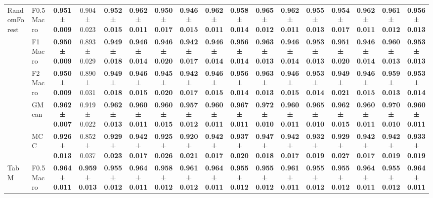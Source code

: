 \begin{table}[H]
{\begin{tabular}{llccccccccccccccc}
\cline{1-17}
\multirow[t]{5}{*}{RandomForest} & F0.5 Macro & \textbf{0.951 ± 0.009} & 0.904 ± 0.023 & \textbf{0.952 ± 0.015} & \textbf{0.962 ± 0.011} & \textbf{0.950 ± 0.017} & \textbf{0.946 ± 0.015} & \textbf{0.962 ± 0.011} & \textbf{0.958 ± 0.014} & \textbf{0.965 ± 0.012} & \textbf{0.962 ± 0.011} & \textbf{0.955 ± 0.013} & \textbf{0.954 ± 0.017} & \textbf{0.962 ± 0.011} & \textbf{0.961 ± 0.012} & \textbf{0.956 ± 0.013} \\
 & F1 Macro & \textbf{0.950 ± 0.009} & 0.893 ± 0.029 & \textbf{0.949 ± 0.018} & \textbf{0.946 ± 0.014} & \textbf{0.946 ± 0.020} & \textbf{0.942 ± 0.017} & \textbf{0.946 ± 0.014} & \textbf{0.956 ± 0.014} & \textbf{0.963 ± 0.013} & \textbf{0.946 ± 0.014} & \textbf{0.953 ± 0.013} & \textbf{0.951 ± 0.020} & \textbf{0.946 ± 0.014} & \textbf{0.960 ± 0.013} & \textbf{0.953 ± 0.013} \\
 & F2 Macro & \textbf{0.950 ± 0.009} & 0.890 ± 0.031 & \textbf{0.949 ± 0.018} & \textbf{0.946 ± 0.015} & \textbf{0.945 ± 0.020} & \textbf{0.942 ± 0.017} & \textbf{0.946 ± 0.015} & \textbf{0.956 ± 0.014} & \textbf{0.963 ± 0.013} & \textbf{0.946 ± 0.015} & \textbf{0.953 ± 0.014} & \textbf{0.949 ± 0.021} & \textbf{0.946 ± 0.015} & \textbf{0.959 ± 0.013} & \textbf{0.953 ± 0.014} \\
 & GMean & \textbf{0.962 ± 0.007} & 0.919 ± 0.022 & \textbf{0.962 ± 0.013} & \textbf{0.960 ± 0.011} & \textbf{0.960 ± 0.015} & \textbf{0.957 ± 0.012} & \textbf{0.960 ± 0.011} & \textbf{0.967 ± 0.011} & \textbf{0.972 ± 0.010} & \textbf{0.960 ± 0.011} & \textbf{0.965 ± 0.010} & \textbf{0.962 ± 0.015} & \textbf{0.960 ± 0.011} & \textbf{0.970 ± 0.010} & \textbf{0.960 ± 0.011} \\
 & MCC & \textbf{0.926 ± 0.013} & 0.852 ± 0.037 & \textbf{0.929 ± 0.023} & \textbf{0.942 ± 0.017} & \textbf{0.925 ± 0.026} & \textbf{0.920 ± 0.021} & \textbf{0.942 ± 0.017} & \textbf{0.937 ± 0.020} & \textbf{0.947 ± 0.018} & \textbf{0.942 ± 0.017} & \textbf{0.932 ± 0.019} & \textbf{0.929 ± 0.027} & \textbf{0.942 ± 0.017} & \textbf{0.942 ± 0.019} & \textbf{0.933 ± 0.019} \\
\cline{1-17}
\multirow[t]{5}{*}{TabM} & F0.5 Macro & \textbf{0.964 ± 0.011} & \textbf{0.959 ± 0.013} & \textbf{0.955 ± 0.012} & \textbf{0.964 ± 0.011} & \textbf{0.958 ± 0.012} & \textbf{0.961 ± 0.012} & \textbf{0.964 ± 0.011} & \textbf{0.955 ± 0.012} & \textbf{0.955 ± 0.012} & \textbf{0.961 ± 0.011} & \textbf{0.955 ± 0.012} & \textbf{0.955 ± 0.012} & \textbf{0.964 ± 0.011} & \textbf{0.955 ± 0.012} & \textbf{0.964 ± 0.011} \\

\end{tabular}}
\end{table}

